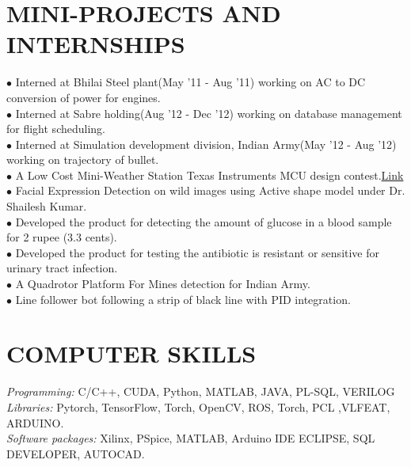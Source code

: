 \documentclass[7pt]{article}
\begin{document}
\begin{small}
\section{MINI-PROJECTS AND INTERNSHIPS} 
$\bullet$ Interned at Bhilai Steel plant(May '11 - Aug '11) working on AC to DC conversion of power for engines.\\
$\bullet$ Interned at Sabre holding(Aug '12 - Dec '12) working on database management for flight scheduling.\\
$\bullet$ Interned at Simulation development division, Indian Army(May '12 - Aug '12) working on trajectory of bullet.\\
$\bullet$ A Low Cost Mini-Weather Station Texas Instruments MCU design contest.\href{http://www.youtube.com/watch?v=kyFDzlU89iE}{Link} \\
$\bullet$ Facial Expression Detection on wild images using Active shape model under Dr. Shailesh Kumar. \\
$\bullet$ Developed the product for detecting the amount of glucose in a blood sample for 2 rupee (3.3 cents). \\
$\bullet$  Developed the product for testing the antibiotic is resistant or sensitive for urinary tract infection.\\
$\bullet$ A Quadrotor Platform For Mines detection for Indian Army.\\
$\bullet$ Line follower bot following a strip of black line with PID integration.\\
\vspace{-4 mm}

\section{COMPUTER SKILLS} 
{\sl Programming:}        C/C++, CUDA, Python, MATLAB, JAVA, PL-SQL, VERILOG\\
{\sl Libraries:        }      Pytorch, TensorFlow, Torch, OpenCV, ROS, Torch, PCL ,VLFEAT, ARDUINO.\\
{\sl Software packages: } Xilinx, PSpice, MATLAB, Arduino IDE
                       ECLIPSE, SQL DEVELOPER, AUTOCAD.\\
 

\end{small}
\end{document}
